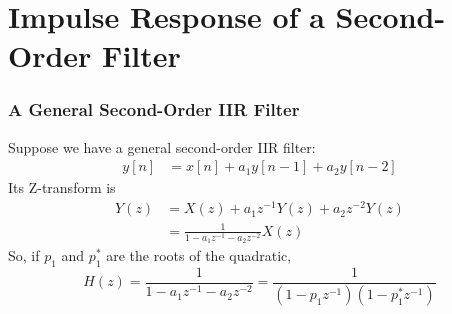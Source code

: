 \documentclass{beamer}
\begin{document}
%
%

\section[Second-Order]{Impulse Response of a Second-Order Filter}
\setcounter{subsection}{1}

\begin{frame}
  \frametitle{A General Second-Order IIR Filter}

  Suppose we have a general second-order IIR filter:
  \begin{align*}
    y[n] &= x[n] + a_1y[n-1] +a_2 y[n-2]
  \end{align*}
  Its Z-transform is
  \begin{align*}
    Y(z) &= X(z) + a_1z^{-1}Y(z) +a_2z^{-2}Y(z)\\
    &= \frac{1}{1-a_1z^{-1}-a_2z^{-2}} X(z)
  \end{align*}
  So, if $p_1$ and $p_1^*$ are the roots of the quadratic,
  \[
  H(z) = \frac{1}{1-a_1z^{-1}-a_2z^{-2}} = \frac{1}{(1-p_1z^{-1})(1-p_1^*z^{-1})}
  \]
\end{frame}
\end{document}

